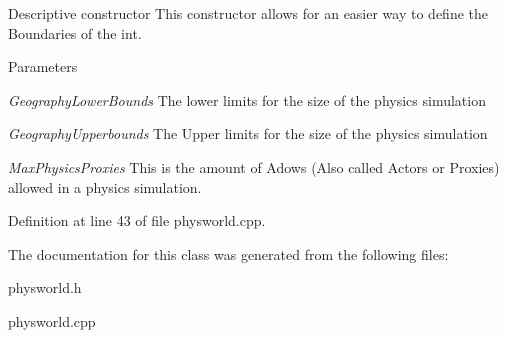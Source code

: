 Descriptive constructor This constructor allows for an easier way to define the Boundaries of the int. 
\begin{DoxyParams}{Parameters}
\item[{\em GeographyLowerBounds}]The lower limits for the size of the physics simulation \item[{\em GeographyUpperbounds}]The Upper limits for the size of the physics simulation \item[{\em MaxPhysicsProxies}]This is the amount of Adows (Also called Actors or Proxies) allowed in a physics simulation. \end{DoxyParams}


Definition at line 43 of file physworld.cpp.

The documentation for this class was generated from the following files:\begin{DoxyCompactItemize}
\item 
physworld.h\item 
physworld.cpp\end{DoxyCompactItemize}
